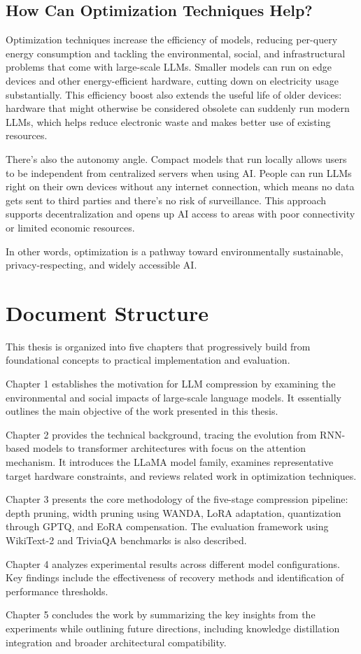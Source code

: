 \subsection{How Can Optimization Techniques Help?}
Optimization techniques increase the efficiency of models, reducing per-query energy consumption and tackling the environmental, social, and infrastructural problems that come with large-scale LLMs. Smaller models can run on edge devices and other energy-efficient hardware, cutting down on electricity usage substantially. This efficiency boost also extends the useful life of older devices: hardware that might otherwise be considered obsolete can suddenly run modern LLMs, which helps reduce electronic waste and makes better use of existing resources.

There's also the autonomy angle. Compact models that run locally allows users to be independent from centralized servers when using AI. People can run LLMs right on their own devices without any internet connection, which means no data gets sent to third parties and there's no risk of surveillance. This approach supports decentralization and opens up AI access to areas with poor connectivity or limited economic resources.

In other words, optimization is a pathway toward environmentally sustainable, privacy-respecting, and widely accessible AI.


\section{Document Structure}
This thesis is organized into five chapters that progressively build from foundational concepts to practical implementation and evaluation.

Chapter 1 establishes the motivation for LLM compression by examining the environmental and social impacts of large-scale language models. It essentially outlines the main objective of the work presented in this thesis.

Chapter 2 provides the technical background, tracing the evolution from RNN-based models to transformer architectures with focus on the attention mechanism. It introduces the LLaMA model family, examines representative target hardware constraints, and reviews related work in optimization techniques.

Chapter 3 presents the core methodology of the five-stage compression pipeline: depth pruning, width pruning using WANDA, LoRA adaptation, quantization through GPTQ, and EoRA compensation. The evaluation framework using WikiText-2 and TriviaQA benchmarks is also described.

Chapter 4 analyzes experimental results across different model configurations. Key findings include the effectiveness of recovery methods and identification of performance thresholds.

Chapter 5 concludes the work by summarizing the key insights from the experiments while outlining future directions, including knowledge distillation integration and broader architectural compatibility.